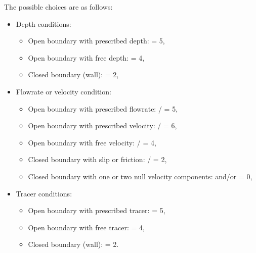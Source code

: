 The possible choices are as follows:

\begin{itemize}
\item Depth conditions:

\begin{itemize}

\item Open boundary with prescribed depth:  = 5,

\item Open boundary with free depth:  = 4,

\item Closed boundary (wall):  = 2,
\end{itemize}

\item Flowrate or velocity condition:

\begin{itemize}

\item Open boundary with prescribed flowrate: /
= 5,

\item Open boundary with prescribed velocity: /
= 6,

\item Open boundary with free velocity: / = 4,

\item Closed boundary with slip or friction: /
= 2,

\item Closed boundary with one or two null velocity components: 
and/or  = 0,
\end{itemize}

\item Tracer conditions:

\begin{itemize}

\item Open boundary with prescribed tracer:  = 5,

\item Open boundary with free tracer:  = 4,

\item Closed boundary (wall):  = 2.
\end{itemize}

\end{itemize}

